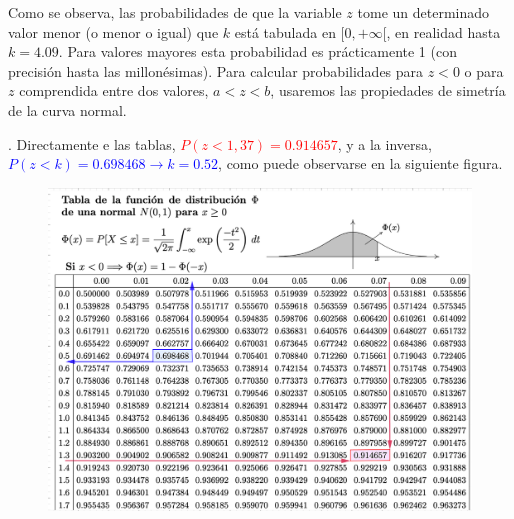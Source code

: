 Como se observa, las probabilidades de que la variable $z$ tome un determinado valor menor (o menor o igual) que $k$ está tabulada en $[0,+\infty[$, en realidad hasta $k=4.09$. Para valores mayores esta probabilidad es prácticamente 1 (con precisión hasta las millonésimas). Para calcular probabilidades para $z<0$ o para $z$ comprendida entre dos valores, $a<z<b$, usaremos las propiedades de simetría de la curva normal.

\begin{example}
.	Directamente e las tablas, \textcolor{red}{$P(z<1,37)=0.914657$}, y a la inversa, \textcolor{blue}{$P(z<k)=0.698468 \to k=0.52$}, como puede observarse en la siguiente figura.

	\begin{figure}[H]
	\centering
	\includegraphics[width=.95\textwidth]{imagenes/imagenes04/T04IM17.png}
	\end{figure}
\end{example}


